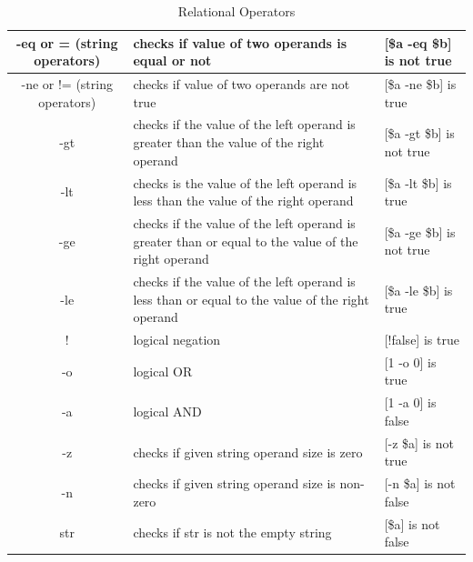 \documentclass[11pt]{article}
\begin{document}
\begin{table}[htbp]
    \centering
    \caption*{Relational Operators}
    \begin{tabularx}{\textwidth}{|c|X|X|}
        \hline
        -eq or = (string operators) & checks if value of two operands is equal or not & [\$a -eq \$b] is not true \\ \hline
        -ne or != (string operators) & checks if value of two operands are not true & [\$a -ne \$b] is true \\ \hline
        -gt & checks if the value of the left operand is greater than the value of the right operand & [\$a -gt \$b] is not true \\ \hline
        -lt & checks is the value of the left operand is less than the value of the right operand & [\$a -lt \$b] is true \\ \hline
        -ge & checks if the value of the left operand is greater than or equal to the value of the right operand & [\$a -ge \$b] is not true \\ \hline
        -le & checks if the value of the left operand is less than or equal to the value of the right operand & [\$a -le \$b] is true \\ \hline
        ! & logical negation & [!false] is true \\ \hline
        -o & logical OR & [1 -o 0] is true \\ \hline
        -a & logical AND & [1 -a 0] is false \\ \hline
        -z & checks if given string operand size is zero & [-z \$a] is not true \\ \hline
        -n & checks if given string operand size is non-zero & [-n \$a] is not false \\ \hline
        str & checks if str is not the empty string & [\$a] is not false \\
        \hline
    \end{tabularx}
\end{table}
\end{document}
